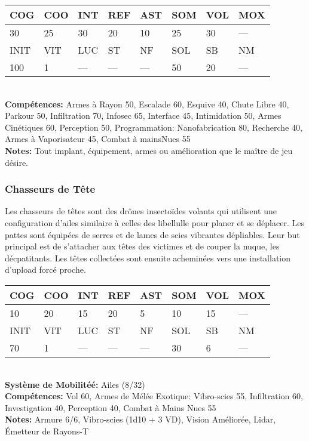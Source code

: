 {\begin{tabular}{|l|l|l|l|l|l|l|l|}
COG &COO &INT &REF &AST &SOM &VOL &MOX \\ \hline

30 &25 &30 &20 &10 &25 &30 &— \\ \hline

INIT &VIT &LUC &ST &NF &SOL &SB &NM \\ \hline

100 &1 &— &— &— &50 &20 &— \\ \hline

\end{tabular} \\ \textbf{Compétences:} Armes à Rayon 50, Escalade 60, Esquive 40, Chute Libre 40, Parkour 50, Infiltration 70, Infosec 65, Interface 45, Intimidation 50, Armes Cinétiques 60, Perception 50, Programmation: Nanofabrication 80, Recherche 40, Armes à Vaporisateur 45, Combat à mainsNues 55 \\ \textbf{Notes:} Tout implant, équipement, armes ou amélioration que le maître de jeu désire. 



\subsubsection{Chasseurs de Tête} 

Les chasseurs de têtes sont des drônes insectoïdes volants qui utilisent une configuration d'ailes similaire à celles des libellulle pour planer et se déplacer. Les pattes sont équipées de serres et de lames de scies vibrantes dépliables. Leur but principal est de s'attacher aux têtes des victimes et de couper la nuque, les décpatitants. Les têtes collectées sont ensuite acheminées vers une installation d'upload forcé proche. \\ \begin{tabular}{|l|l|l|l|l|l|l|l|} \hline

COG &COO &INT &REF &AST &SOM &VOL &MOX \\ \hline

10 &20 &15 &20 &5 &10 &15 &— \\ \hline

INIT &VIT &LUC &ST &NF &SOL &SB &NM \\ \hline

70 &1 &— &— &— &30 &6 &— \\ \hline

\end{tabular} \\ \textbf{Système de Mobilitéé: }Ailes (8/32) \\ \textbf{Compétences:} Vol 60, Armes de Mélée Exotique: Vibro-scies 55, Infiltration 60, Investigation 40, Perception 40, Combat à Mains Nues 55\\ \textbf{Notes:} Armure 6/6, Vibro-scies (1d10 + 3 VD), Vision Améliorée, Lidar, Émetteur de Rayons-T 

}
